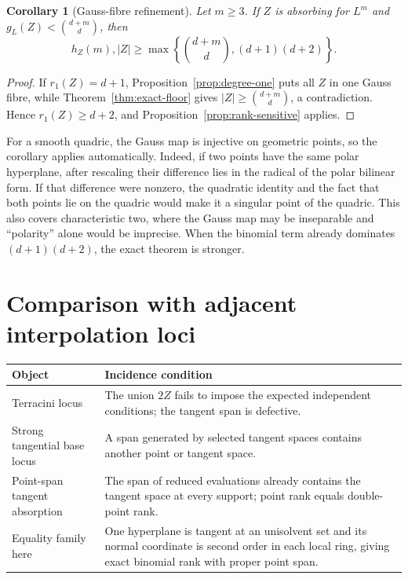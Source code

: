 \documentclass[11pt]{article}
\newtheorem{corollary}[theorem]{Corollary}
\begin{document}
\begin{corollary}[Gauss-fibre refinement]\label{cor:gauss}
Let $m\geq3$.  If $Z$ is absorbing for $L^m$ and
$g_L(Z)<\binom{d+m}{d}$, then
\[
 h_Z(m),|Z|\geq
 \max\left\{\binom{d+m}{d},(d+1)(d+2)\right\}.
\]
\end{corollary}

\begin{proof}
If $r_1(Z)=d+1$, Proposition~\ref{prop:degree-one} puts all $Z$ in one Gauss
fibre, while Theorem~\ref{thm:exact-floor} gives
$|Z|\geq\binom{d+m}{d}$, a contradiction.  Hence $r_1(Z)\geq d+2$, and
Proposition~\ref{prop:rank-sensitive} applies.
\end{proof}

For a smooth quadric, the Gauss map is injective on geometric points, so the
corollary applies automatically.  Indeed, if two points have the same polar
hyperplane, after rescaling their difference lies in the radical of the polar
bilinear form.  If that difference were nonzero, the quadratic identity and
the fact that both points lie on the quadric would make it a singular point of
the quadric.  This also covers characteristic two, where the Gauss map may be
inseparable and ``polarity'' alone would be imprecise.  When the binomial term
already dominates $(d+1)(d+2)$, the exact theorem is stronger.

\section{Comparison with adjacent interpolation loci}\label{sec:comparison}

\begin{center}
\begin{tabular}{p{}p{}}
\toprule
Object & Incidence condition \\
\midrule
Terracini locus & The union $2Z$ fails to impose the expected independent
conditions; the tangent span is defective. \\
Strong tangential base locus & A span generated by selected tangent spaces
contains another point or tangent space. \\
Point-span tangent absorption & The span of reduced evaluations already
contains the tangent space at every support; point rank equals double-point
rank. \\
Equality family here & One hyperplane is tangent at an unisolvent set and its
normal coordinate is second order in each local ring, giving exact binomial
rank with proper point span. \\
\bottomrule
\end{tabular}
\end{center}
\end{document}
